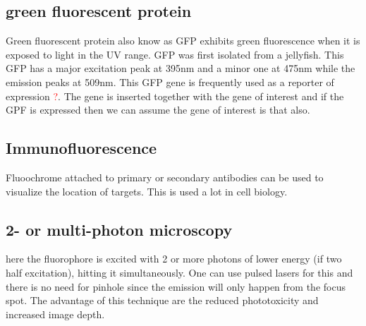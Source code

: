 	\subsection*{green fluorescent protein}
	Green fluorescent protein also know as GFP exhibits green fluorescence when it is exposed to light in the UV range. GFP was first isolated from a jellyfish. This GFP has a major excitation peak at 395nm and a minor one at 475nm while the emission peaks at 509nm. This GFP gene is frequently used as a reporter of expression \textcolor{red}{?}. The gene is inserted together with the gene of interest and if the GPF is expressed then we can assume the  gene of interest is that also.

	\subsection*{Immunofluorescence}
	Fluoochrome attached to primary or secondary antibodies can be used to visualize the location of targets. This is used a lot in cell biology. 

	\subsection*{2- or multi-photon microscopy}
	here the fluorophore is excited with 2 or more photons of lower energy (if two half excitation), hitting it simultaneously. One can use pulsed lasers for this and there is no need for pinhole since the emission will only happen from the focus spot. The advantage of this technique are the reduced phototoxicity and increased image depth. 
	 




